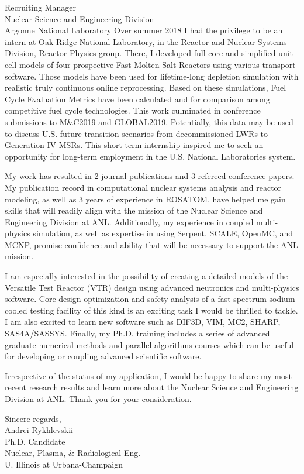 \documentclass[11pt]{letter} %
\newcommand{\RecipientName}{Recruiting Manager\xspace}
\newcommand{\RecipientAddress}{Nuclear Science and Engineering Division \\
Argonne National Laboratory}
\begin{document}
\begin{letter}{\RecipientName\\
        \RecipientAddress\xspace}
Over summer 2018 I had the privilege to be an intern at Oak Ridge National 
Laboratory, in the Reactor and Nuclear Systems Division, Reactor Physics 
group. There, I developed full-core and simplified unit cell models of four 
prospective Fast Molten Salt Reactors using various transport software. Those 
models have been used for lifetime-long depletion simulation with realistic 
truly continuous online reprocessing. Based on these simulations, Fuel Cycle 
Evaluation Metrics have been calculated and for comparison among competitive 
fuel cycle technologies. This work culminated in conference submissions to 
M\&C2019 and GLOBAL2019. Potentially, this data may be used to discuss U.S. 
future transition scenarios from decommissioned LWRs to Generation IV MSRs. 
This short-term internship inspired me to seek an opportunity for long-term 
employment in the U.S. National Laboratories system.

My work has resulted in 2 journal publications and 3 refereed conference 
papers. My publication record in computational nuclear systems analysis and 
reactor modeling, as well as 3 years of experience in ROSATOM, have helped me 
gain skills that will readily align with the mission of the Nuclear Science 
and Engineering Division at ANL. Additionally, my experience in coupled 
multi-physics simulation, as well as expertise in using Serpent, SCALE, 
OpenMC, and MCNP, promise confidence and ability that will be necessary to 
support the ANL mission. 

I am especially interested in the possibility of creating a detailed models of 
the Versatile Test Reactor (VTR) design using advanced neutronics and 
multi-physics software. Core design optimization and safety analysis of a fast 
spectrum sodium-cooled testing facility of this kind is an exciting task I 
would be thrilled to tackle. I am also excited to learn new software such as 
DIF3D, VIM, MC2, SHARP, SAS4A/SASSYS. Finally, my Ph.D. training includes a 
series of advanced graduate numerical methods and parallel algorithms courses 
which can be useful for developing or coupling advanced scientific software.

Irrespective of the status of my application, I would be happy to share my 
most recent research results and learn more about the Nuclear Science and 
Engineering Division at ANL. Thank you for your consideration.


\closing{Sincere regards,\\
{Andrei Rykhlevskii\\
Ph.D. Candidate\\
Nuclear, Plasma, \& Radiological Eng.\\
U. Illinois at Urbana-Champaign}
}


\end{letter}
\end{document}
